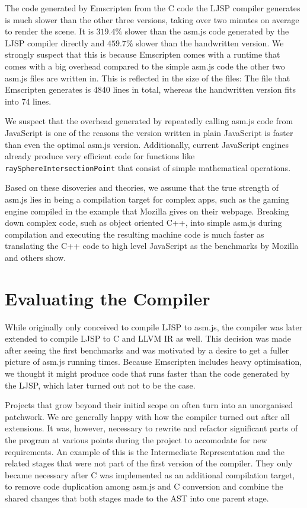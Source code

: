 \documentclass[11pt]{report}
\begin{document}
The code generated by Emscripten from the C code the LJSP compiler generates is much slower than the other three versions, taking over two minutes on average to render the scene. It is $319.4\%$ slower than the asm.js code generated by the LJSP compiler directly and $459.7\%$ slower than the handwritten version. We strongly suspect that this is because Emscripten comes with a runtime that comes with a big overhead compared to the simple asm.js code the other two asm.js files are written in. This is reflected in the size of the files: The file that Emscripten generates is 4840 lines in total, whereas the handwritten version fits into 74 lines.

We suspect that the overhead generated by repeatedly calling asm.js code from JavaScript is one of the reasons the version written in plain JavaScript is faster than even the optimal asm.js version. Additionally, current JavaScript engines already produce very efficient code for functions like \texttt{raySphereIntersectionPoint} that consist of simple mathematical operations.

Based on these disoveries and theories, we assume that the true strength of asm.js lies in being a compilation target for complex apps, such as the gaming engine compiled in the example that Mozilla gives on their webpage. Breaking down complex code, such as object oriented C++, into simple asm.js during compilation and executing the resulting machine code is much faster as translating the C++ code to high level JavaScript as the benchmarks by Mozilla and others show.

\section{Evaluating the Compiler}

While originally only conceived to compile LJSP to asm.js, the compiler was later extended to compile LJSP to C and LLVM IR as well. This decision was made after seeing the first benchmarks and was motivated by a desire to get a fuller picture of asm.js running times. Because Emscripten includes heavy optimisation, we thought it might produce code that runs faster than the code generated by the LJSP, which later turned out not to be the case.

Projects that grow beyond their initial scope on often turn into an unorganised patchwork. We are generally happy with how the compiler turned out after all extensions. It was, however, necessary to rewrite and refactor significant parts of the program at various points during the project to accomodate for new requirements. An example of this is the Intermediate Representation and the related stages that were not part of the first version of the compiler. They only became necessary after C was implemented as an additional compilation target, to remove code duplication among asm.js and C conversion and combine the shared changes that both stages made to the AST into one parent stage.
\end{document}
